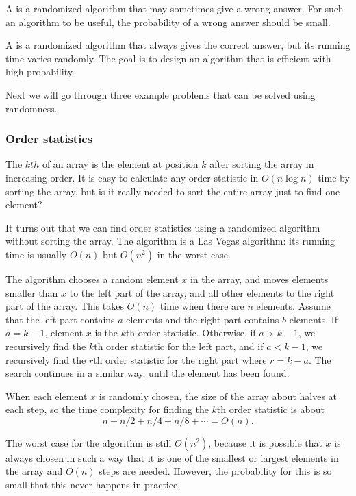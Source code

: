 
A  is a randomized algorithm
that may sometimes give a wrong answer.
For such an algorithm to be useful,
the probability of a wrong answer should be small.


A  is a randomized algorithm
that always gives the correct answer,
but its running time varies randomly.
The goal is to design an algorithm that is
efficient with high probability.

Next we will go through three example problems that
can be solved using randomness.

\subsubsection{Order statistics}


The $kth$  of an array
is the element at position $k$ after sorting
the array in increasing order.
It is easy to calculate any order statistic
in $O(n \log n)$ time by sorting the array,
but is it really needed to sort the entire array
just to find one element?

It turns out that we can find order statistics
using a randomized algorithm without sorting the array.
The algorithm is a Las Vegas algorithm:
its running time is usually $O(n)$
but $O(n^2)$ in the worst case.

The algorithm chooses a random element $x$
in the array, and moves elements smaller than $x$
to the left part of the array,
and all other elements to the right part of the array.
This takes $O(n)$ time when there are $n$ elements.
Assume that the left part contains $a$ elements
and the right part contains $b$ elements.
If $a=k-1$, element $x$ is the $k$th order statistic.
Otherwise, if $a>k-1$, we recursively find the $k$th order
statistic for the left part,
and if $a<k-1$, we recursively find the $r$th order
statistic for the right part where $r=k-a$.
The search continues in a similar way, until the element
has been found.

When each element $x$ is randomly chosen,
the size of the array about halves at each step,
so the time complexity for
finding the $k$th order statistic is about
\[n+n/2+n/4+n/8+\cdots=O(n).\]

The worst case for the algorithm is still $O(n^2)$,
because it is possible that $x$ is always chosen
in such a way that it is one of the smallest or largest
elements in the array and $O(n)$ steps are needed.
However, the probability for this is so small
that this never happens in practice.

